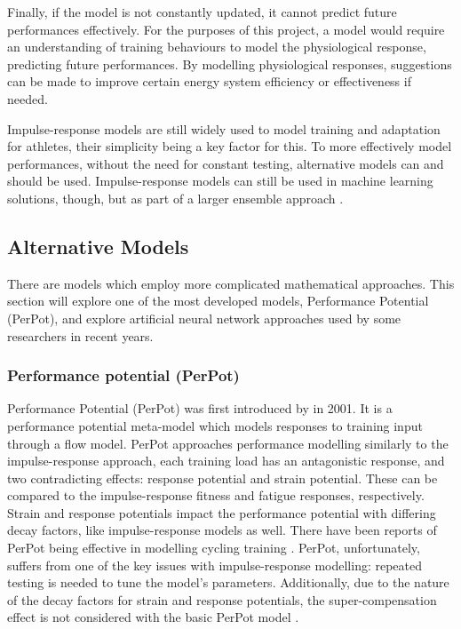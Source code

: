 Finally, if the model is not constantly updated, it cannot predict future performances effectively. For the purposes of this project, a model would require an understanding of training behaviours to model the physiological response, predicting future performances. By modelling physiological responses, suggestions can be made to improve certain energy system efficiency or effectiveness if needed. 

Impulse-response models are still widely used to model training and adaptation for athletes, their simplicity being a key factor for this. To more effectively model performances, without the need for constant testing, alternative models can and should be used. Impulse-response models can still be used in machine learning solutions, though, but as part of a larger ensemble approach \cite{Imbach2022}.

\subsection{Alternative Models}
There are models which employ more complicated mathematical approaches. This section will explore one of the most developed models, Performance Potential (PerPot), and explore artificial neural network approaches used by some researchers in recent years.

\subsubsection{Performance potential (PerPot)}
Performance Potential (PerPot) was first introduced by \textcite{perl2001} in 2001. It is a performance potential meta-model which models responses to training input through a flow model. PerPot approaches performance modelling similarly to the impulse-response approach, each training load has an antagonistic response, and two contradicting effects: response potential and strain potential. These can be compared to the impulse-response fitness and fatigue responses, respectively. Strain and response potentials impact the performance potential with differing decay factors, like impulse-response models as well. There have been reports of PerPot being effective in modelling cycling training \cite{Churchill2014}. PerPot, unfortunately, suffers from one of the key issues with impulse-response modelling: repeated testing is needed to tune the model's parameters. Additionally, due to the nature of the decay factors for strain and response potentials, the super-compensation effect is not considered with the basic PerPot model \cite{Churchill2014}. 

